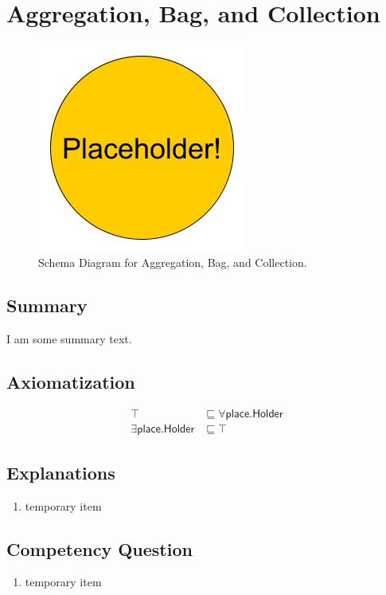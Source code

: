 \section{Aggregation, Bag, and Collection}
\label{sec:Aggregation,}
\begin{figure}[h!]
\begin{center}
\includegraphics[width=.4\textwidth]{figures/placeholder}
\end{center}
\caption{Schema Diagram for Aggregation, Bag, and Collection.}
\label{fig:Aggregation,}
\end{figure}
\subsection{Summary}
\label{sum:Aggregation,}
I am some summary text.

\subsection{Axiomatization}
\label{axs:Aggregation,}
\begin{align}
\top &\sqsubseteq \forall\textsf{place.Holder} \\ 
\exists\textsf{place.Holder} &\sqsubseteq \top 
\end{align}

\subsection{Explanations}
\label{exp:Aggregation,}
\begin{enumerate}
\item temporary item
\end{enumerate}

\subsection{Competency Question}
\label{cqs:Aggregation,}
\begin{enumerate}[CQ1.]
\item temporary item
\end{enumerate}

\newpage
